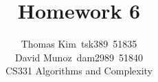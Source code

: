 \documentclass[12pt]{article}
\begin{document}
\title{Homework 6}
\author{Thomas Kim~tsk389~51835\\David Munoz~dam2989~51840\\
CS331 Algorithms and Complexity}

\renewcommand{\arraystretch}{2.0}

\date{} %


\maketitle

\onecolumn









\end{document}
